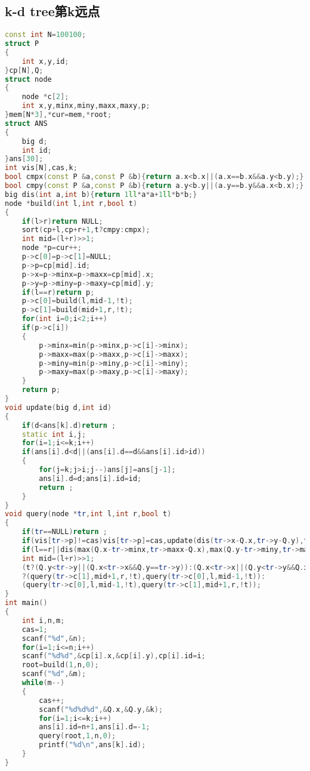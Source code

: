 \subsection{k-d tree第k远点}
    \begin{lstlisting}[language=c++]
const int N=100100;
struct P
{
	int x,y,id;
}cp[N],Q;
struct node
{
	node *c[2];
	int x,y,minx,miny,maxx,maxy,p;
}mem[N*3],*cur=mem,*root;
struct ANS
{
	big d;
	int id;
}ans[30];
int vis[N],cas,k;
bool cmpx(const P &a,const P &b){return a.x<b.x||(a.x==b.x&&a.y<b.y);}
bool cmpy(const P &a,const P &b){return a.y<b.y||(a.y==b.y&&a.x<b.x);}
big dis(int a,int b){return 1ll*a*a+1ll*b*b;}
node *build(int l,int r,bool t)
{
	if(l>r)return NULL;
	sort(cp+l,cp+r+1,t?cmpy:cmpx);
	int mid=(l+r)>>1;
	node *p=cur++;
	p->c[0]=p->c[1]=NULL;
	p->p=cp[mid].id;
	p->x=p->minx=p->maxx=cp[mid].x;
	p->y=p->miny=p->maxy=cp[mid].y;
	if(l==r)return p;
	p->c[0]=build(l,mid-1,!t);
	p->c[1]=build(mid+1,r,!t);
	for(int i=0;i<2;i++)
	if(p->c[i])
	{
		p->minx=min(p->minx,p->c[i]->minx);
		p->maxx=max(p->maxx,p->c[i]->maxx);
		p->miny=min(p->miny,p->c[i]->miny);
		p->maxy=max(p->maxy,p->c[i]->maxy);
	}
	return p;
}
void update(big d,int id)
{
	if(d<ans[k].d)return ;
	static int i,j;
	for(i=1;i<=k;i++)
	if(ans[i].d<d||(ans[i].d==d&&ans[i].id>id))
	{
		for(j=k;j>i;j--)ans[j]=ans[j-1];
		ans[i].d=d;ans[i].id=id;
		return ;
	}
}
void query(node *tr,int l,int r,bool t)
{
	if(tr==NULL)return ;
	if(vis[tr->p]!=cas)vis[tr->p]=cas,update(dis(tr->x-Q.x,tr->y-Q.y),tr->p);
	if(l==r||dis(max(Q.x-tr->minx,tr->maxx-Q.x),max(Q.y-tr->miny,tr->maxy-Q.y))<ans[k].d)return ;
	int mid=(l+r)>>1;
	(t?(Q.y<tr->y||(Q.x<tr->x&&Q.y==tr->y)):(Q.x<tr->x||(Q.y<tr->y&&Q.x==tr->x)))
	?(query(tr->c[1],mid+1,r,!t),query(tr->c[0],l,mid-1,!t)):
	(query(tr->c[0],l,mid-1,!t),query(tr->c[1],mid+1,r,!t));
}
int main()
{
	int i,n,m;
	cas=1;
	scanf("%d",&n);
	for(i=1;i<=n;i++)
	scanf("%d%d",&cp[i].x,&cp[i].y),cp[i].id=i;
	root=build(1,n,0);
	scanf("%d",&m);
	while(m--)
	{
		cas++;
		scanf("%d%d%d",&Q.x,&Q.y,&k);
		for(i=1;i<=k;i++)
		ans[i].id=n+1,ans[i].d=-1;
		query(root,1,n,0);
		printf("%d\n",ans[k].id);
	}
}
    \end{lstlisting}
